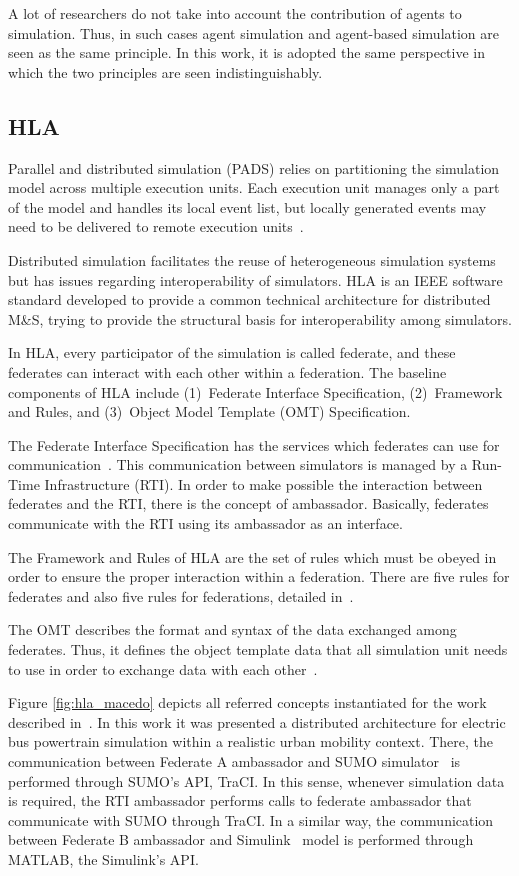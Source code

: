 \documentclass[conference]{IEEEtran}
\begin{document}
A lot of researchers do not take into account the contribution of agents to simulation. Thus, in such cases agent simulation and agent-based simulation are seen as the same principle. In this work, it is adopted the same perspective in which the two principles are seen indistinguishably.

\subsection{HLA}

Parallel and distributed simulation (PADS) relies on partitioning the simulation model across multiple execution units. Each execution unit manages only a part of the model and handles its local event list, but locally generated events may need to be delivered to remote execution units~\cite{DAngelo2014320}.

Distributed simulation facilitates the reuse of heterogeneous simulation systems but has issues regarding interoperability of simulators. HLA is an IEEE software standard developed to provide a common technical architecture for distributed M\&S, trying to provide the structural basis for interoperability among simulators.

In HLA, every participator of the simulation is called federate, and these federates can interact with each other within a federation. The baseline components of HLA include (1)~Federate Interface Specification, (2)~Framework and Rules, and (3)~Object Model Template (OMT) Specification.

The Federate Interface Specification has the services which federates can use for communication~\cite{ieee2010hlaFederate}. This communication between simulators is managed by a Run-Time Infrastructure (RTI). In order to make possible the interaction between federates and the RTI, there is the concept of ambassador. Basically, federates communicate with the RTI using its ambassador as an interface.

The Framework and Rules of HLA are the set of rules which must be obeyed in order to ensure the proper interaction within a federation. There are five rules for federates and also five rules for federations, detailed in~\cite{ieee2010hlaRUules}.

The OMT describes the format and syntax of the data exchanged among federates. Thus, it defines the object template data that all simulation unit needs to use in order to exchange data with each other~\cite{ieee2010hlaOMT}.

Figure \ref{fig:hla_macedo} depicts all referred concepts instantiated for the work described in~\cite{macedo2013intelligent}. In this work it was presented a distributed architecture for electric bus powertrain simulation within a realistic urban mobility context. There, the communication between Federate A ambassador and SUMO simulator~\cite{behrisch2011sumo} is performed through SUMO's API, TraCI. In this sense, whenever simulation data is required, the RTI ambassador performs calls to federate ambassador that communicate with SUMO through TraCI.
In a similar way, the communication between Federate B ambassador and Simulink~\cite{perrotta2012potential} model is performed through MATLAB, the Simulink's API.
\end{document}
